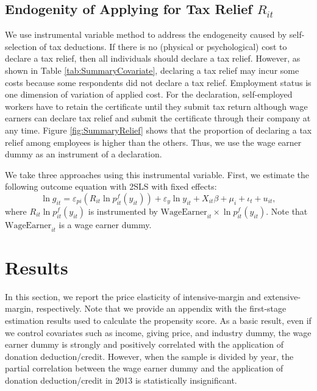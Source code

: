 \documentclass[
  11pt,
  a4paper,
]{article}
\begin{document}
\hypertarget{endogenity-of-applying-for-tax-relief-r_it}{%
\subsection{\texorpdfstring{Endogenity of Applying for Tax Relief \(R_{it}\)}{Endogenity of Applying for Tax Relief R\_\{it\}}}\label{endogenity-of-applying-for-tax-relief-r_it}}

We use instrumental variable method to address the endogeneity caused by self-selection of tax deductions.
If there is no (physical or psychological) cost to declare a tax relief,
then all individuals should declare a tax relief.
However, as shown in Table \ref{tab:SummaryCovariate},
declaring a tax relief may incur some costs because some respondents did not declare a tax relief.
Employment status is one dimension of variation of applied cost.
For the declaration, self-employed workers have to retain the certificate until they submit tax return although wage earners can declare tax relief and submit the certificate through their company at any time.
Figure \ref{fig:SummaryRelief} shows that
the proportion of declaring a tax relief among employees is higher than the others.
Thus, we use the wage earner dummy as an instrument of a declaration.

We take three approaches using this instrumental variable.
First, we estimate the following outcome equation with 2SLS with fixed effects:
\begin{equation}
    \ln g_{it} = \varepsilon_{pi} (R_{it} \ln p^f_{it}(y_{it})) + \varepsilon_y \ln y_{it} 
    + X_{it}\beta +\mu_i +\iota_t +u_{it},
\end{equation}
where \(R_{it} \ln p^f_{it}(y_{it})\) is instrumented by
\(\text{WageEarner}_{it} \times \ln p^f_{it}(y_{it})\).
Note that \(\text{WageEarner}_{it}\) is a wage earner dummy.

\hypertarget{results}{%
\section{Results}\label{results}}

In this section, we report the price elasticity of intensive-margin and
extensive-margin, respectively.
Note that we provide an appendix with the first-stage estimation results
used to calculate the propensity score.
As a basic result, even if we control covariates such as income,
giving price, and industry dummy,
the wage earner dummy is strongly and positively correlated with
the application of donation deduction/credit.
However, when the sample is divided by year,
the partial correlation between the wage earner dummy and
the application of donation deduction/credit in 2013 is
statistically insignificant.
\end{document}
